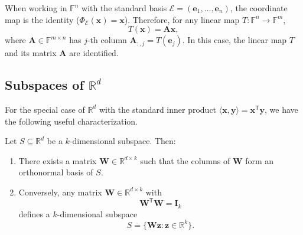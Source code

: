 \begin{corollary}
  When working in $\mathbb{F}^n$ with the standard basis $\mathcal{E} = (\mathbf{e}_1,\dots,\mathbf{e}_n)$,
  the coordinate map is the identity ($\Phi_{\mathcal{E}}(\mathbf{x}) = \mathbf{x}$).
  Therefore, for any linear map $T : \mathbb{F}^n \to \mathbb{F}^m$,
  \begin{equation}
    T(\mathbf{x}) = \mathbf{A}\mathbf{x},
  \end{equation}
  where $\mathbf{A} \in \mathbb{F}^{m \times n}$ has $j$-th column $\mathbf{A}_{:,j} = T(\mathbf{e}_j)$.
  In this case, the linear map $T$ and its matrix $\mathbf{A}$ are identified.
\end{corollary}

\subsection{Subspaces of $\mathbb{R}^d$}

For the special case of $\mathbb{R}^d$ with the standard inner product $\langle \mathbf{x}, \mathbf{y} \rangle = \mathbf{x}^{\mathsf{T}}\mathbf{y}$,
we have the following useful characterization.

\begin{lemma}
  Let $S \subseteq \mathbb{R}^d$ be a $k$-dimensional subspace. Then:
  \begin{enumerate}
    \item There exists a matrix $\mathbf{W} \in \mathbb{R}^{d \times k}$ such that the columns of $\mathbf{W}$ form an orthonormal basis of $S$.
    \item Conversely, any matrix $\mathbf{W} \in \mathbb{R}^{d \times k}$ with
          \begin{equation}
            \mathbf{W}^{\mathsf{T}}\mathbf{W} = \mathbf{I}_k
          \end{equation}
          defines a $k$-dimensional subspace
          \begin{equation}
            S = \{\mathbf{W}\mathbf{z} : \mathbf{z} \in \mathbb{R}^k\}.
          \end{equation}
  \end{enumerate}
\end{lemma}

